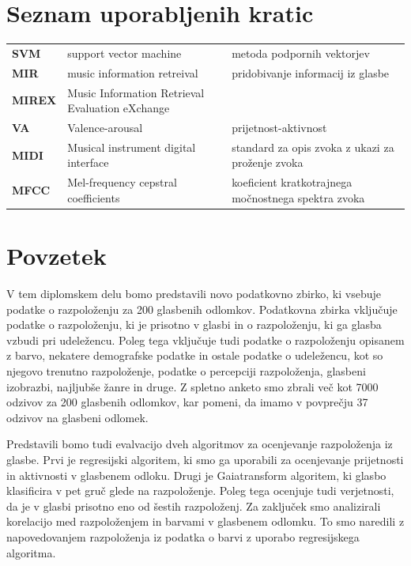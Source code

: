 \documentclass[a4paper, 12pt]{book}
\newcommand{\clearemptydoublepage}{\newpage{\pagestyle{empty}\cleardoublepage}}
\begin{document}
{\chapter*{Seznam uporabljenih kratic}

\begin{tabular}{p{2cm}|p{5.6cm}|p{5.6cm}}
  
  {\bf SVM} & support vector machine & metoda podpornih vektorjev \\
  {\bf MIR} & music information retreival & pridobivanje informacij iz glasbe \\
  {\bf MIREX} & Music Information Retrieval Evaluation eXchange &  \\
  {\bf VA} & Valence-arousal & prijetnost-aktivnost \\
  {\bf MIDI} & Musical instrument digital interface & standard za opis zvoka z ukazi za proženje zvoka \\
  {\bf MFCC} & Mel-frequency cepstral coefficients & koeficient kratkotrajnega močnostnega spektra zvoka \\
  
  
  

\end{tabular}



\clearemptydoublepage

\chapter*{Povzetek}

V tem diplomskem delu bomo predstavili novo podatkovno zbirko, ki vsebuje podatke o razpoloženju za 200 glasbenih odlomkov. Podatkovna zbirka vključuje podatke o razpoloženju, ki je prisotno v glasbi in o razpoloženju, ki ga glasba vzbudi pri udeležencu. Poleg tega vključuje tudi podatke o razpoloženju opisanem z barvo, nekatere demografske podatke in ostale podatke o udeležencu, kot so njegovo trenutno razpoloženje, podatke o percepciji razpoloženja, glasbeni izobrazbi, najljubše žanre in druge. Z spletno anketo smo zbrali več kot 7000 odzivov za 200 glasbenih odlomkov, kar pomeni, da imamo v povprečju 37 odzivov na glasbeni odlomek. 

Predstavili bomo tudi evalvacijo dveh algoritmov za ocenjevanje razpoloženja iz glasbe. Prvi je regresijski algoritem, ki smo ga uporabili za ocenjevanje prijetnosti in aktivnosti v glasbenem odloku. Drugi je Gaiatransform algoritem, ki glasbo klasificira v pet gruč glede na razpoloženje. Poleg tega ocenjuje tudi verjetnosti, da je v glasbi prisotno eno od šestih razpoloženj. Za zaključek smo analizirali korelacijo med razpoloženjem in barvami v glasbenem odlomku. To smo naredili z napovedovanjem razpoloženja iz podatka o barvi z uporabo regresijskega algoritma.  


}
\end{document}
